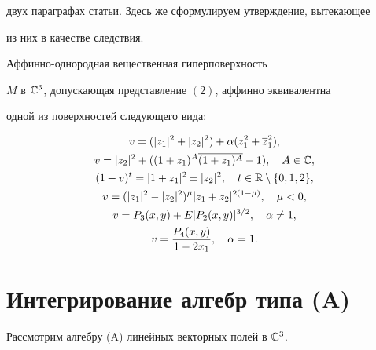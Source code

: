 двух параграфах статьи. Здесь же сформулируем утверждение, вытекающее 


из них в качестве следствия.





\begin{thm}


Аффинно-однородная вещественная гиперповерхность


$ M $ в $ \Bbb C^3 $, допускающая представление $(2)$, аффинно эквивалентна


одной из поверхностей следующего вида\/${:}$


\begin{gather*}


v = ( | z_1 |^2 + |z_2 |^2 ) + \alpha ( z_1^2 + \overline z_1^2 ),\\


v = |z_2|^2 + ( ( 1 + z_1)^A \overline {( 1+ z_1)^A } - 1 ), \quad


A \in \Bbb C, \\


(1 + v )^t = | 1 + z_1 |^2 \pm | z_2 |^2, \quad t \in \Bbb R \setminus 


\{0,1,2 \}, \\


v = 


( |z_1|^2 - |z_2|^2 )^{\mu} | z_1 + z_2 |^{ 2 (1-\mu)},


\quad \mu < 0,\\


v = 


P_3 ( x,y ) + E |P_2(x,y)|^{3/2}, \quad \alpha \ne 1,\\


v = 


\frac{ P_4(x,y)}{1- 2x_1}, \quad \alpha = 1.


\end{gather*}


\end{thm}








\section{Интегрирование алгебр типа (A)}








Рассмотрим алгебру (A) линейных векторных полей в $ \Bbb C^3 $.


